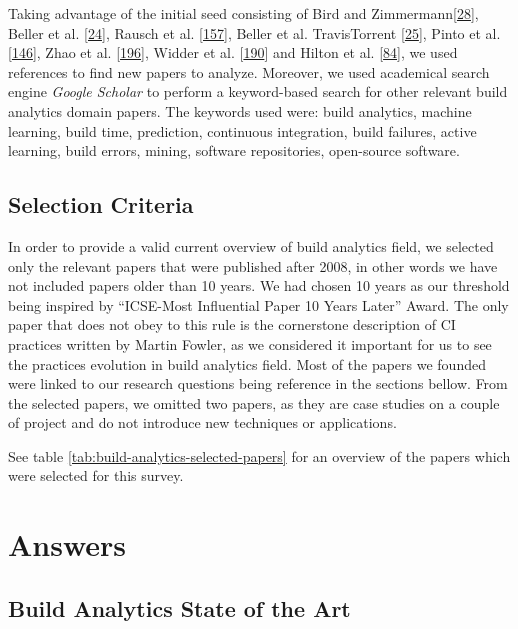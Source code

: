 \documentclass[]{book}
\begin{document}
Taking advantage of the initial seed consisting of Bird and
Zimmermann{[}\protect\hyperlink{ref-bird2017predicting}{28}{]}, Beller
et al. {[}\protect\hyperlink{ref-beller2017oops}{24}{]}, Rausch et al.
{[}\protect\hyperlink{ref-rausch2017empirical}{157}{]}, Beller et al.
TravisTorrent {[}\protect\hyperlink{ref-beller2017travistorrent}{25}{]},
Pinto et al. {[}\protect\hyperlink{ref-pinto2018work}{146}{]}, Zhao et
al. {[}\protect\hyperlink{ref-zhao2017impact}{196}{]}, Widder et al.
{[}\protect\hyperlink{ref-widder2018m}{190}{]} and Hilton et al.
{[}\protect\hyperlink{ref-hilton2016usage}{84}{]}, we used references to
find new papers to analyze. Moreover, we used academical search engine
\emph{Google Scholar} to perform a keyword-based search for other
relevant build analytics domain papers. The keywords used were: build
analytics, machine learning, build time, prediction, continuous
integration, build failures, active learning, build errors, mining,
software repositories, open-source software.

\subsection{Selection Criteria}\label{selection-criteria}

In order to provide a valid current overview of build analytics field,
we selected only the relevant papers that were published after 2008, in
other words we have not included papers older than 10 years. We had
chosen 10 years as our threshold being inspired by ``ICSE-Most
Influential Paper 10 Years Later'' Award. The only paper that does not
obey to this rule is the cornerstone description of CI practices written
by Martin Fowler, as we considered it important for us to see the
practices evolution in build analytics field. Most of the papers we
founded were linked to our research questions being reference in the
sections bellow. From the selected papers, we omitted two papers, as
they are case studies on a couple of project and do not introduce new
techniques or applications.

See table \ref{tab:build-analytics-selected-papers} for an overview of
the papers which were selected for this survey.

\section{Answers}\label{answers}

\subsection{Build Analytics State of the
Art}\label{build-analytics-state-of-the-art}
\end{document}
